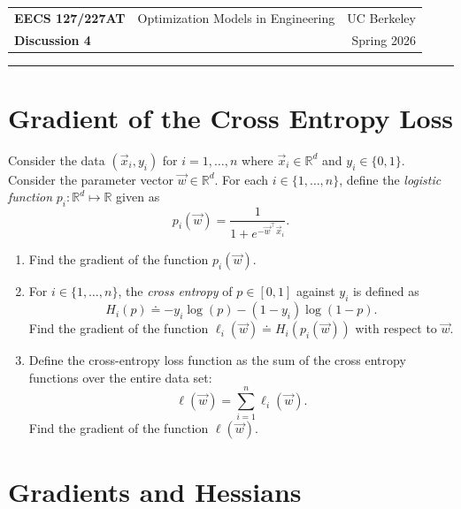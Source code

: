 \documentclass[10pt]{article}
\newcommand{\RR}{\mathbb{R}}
\begin{document}
\begin{center}
\begin{tabular}{lcr}
\textbf{EECS 127/227AT} & Optimization Models in Engineering & UC Berkeley \\
\textbf{Discussion 4} & & Spring 2026
\end{tabular}
\end{center}

\noindent\rule{\textwidth}{0.4pt}

\section{Gradient of the Cross Entropy Loss}

Consider the data $(\vec{x}_i, y_i)$ for $i = 1, \ldots, n$ where $\vec{x}_i \in \RR^d$ and $y_i \in \{0, 1\}$. Consider the parameter vector $\vec{w} \in \RR^d$. For each $i \in \{1, \ldots, n\}$, define the \emph{logistic function} $p_i \colon \RR^d \mapsto \RR$ given as
\begin{equation}
p_i(\vec{w}) = \frac{1}{1 + e^{-\vec{w}^\top \vec{x}_i}}.
\end{equation}

\begin{enumerate}[label=(\alph*)]
\item Find the gradient of the function $p_i(\vec{w})$.

\vspace{8cm}

\item For $i \in \{1, \ldots, n\}$, the \emph{cross entropy} of $p \in [0,1]$ against $y_i$ is defined as
\begin{equation}
H_i(p) \doteq -y_i \log(p) - (1 - y_i) \log(1 - p).
\end{equation}
Find the gradient of the function $\ell_i(\vec{w}) \doteq H_i(p_i(\vec{w}))$ with respect to $\vec{w}$.

\vspace{8cm}

\item Define the cross-entropy loss function as the sum of the cross entropy functions over the entire data set:
\begin{equation}
\ell(\vec{w}) = \sum_{i=1}^{n} \ell_i(\vec{w}).
\end{equation}
Find the gradient of the function $\ell(\vec{w})$.
\end{enumerate}

\newpage

\section{Gradients and Hessians}
\end{document}
